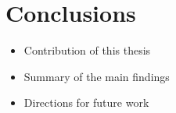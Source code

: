 \chapter{Conclusions}

\begin{itemize}
\item Contribution of this thesis
\item Summary of the main findings
\item Directions for future work
\end{itemize}